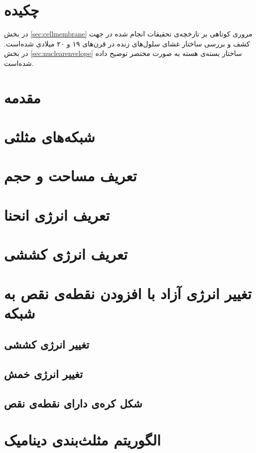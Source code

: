 \setRL
\clearpage
\def \MemDiscr {\Mempath /MembraneDiscrete}

\section{
چکیده
}
در بخش
\ref{sec:cellmembrane}
مروری کوتاهی بر تارخچه‌ی تحقیقات انجام شده در جهت کشف و بررسی ساختار غشای سلول‌های زنده در قرن‌های ۱۹ و ۲۰ میلادی شده‌است. در بخش
\ref{sec:nuclearenvelope}
ساختار بسته‌ی هسته به صورت مختصر توضیح داده شده‌است.

\section{
مقدمه
}



\section{
شبکه‌های مثلثی
}



\section{
تعریف مساحت و حجم
\label{sec:areaVolumeDiscr}
}



\section{
تعریف انرژی انحنا
}



\section{
تعریف انرژی کششی
}


\section{
تغییر انرژی آزاد با افزودن نقطەی نقص به شبکه
}
\subsection{
تغییر انرژی کششی
}

\subsection{
تغییر انرژی خمش
}

\subsection{
شکل کره‌ی دارای نقطه‌ی نقص
\label{sec:gammaTransition}
}


\section{
الگوریتم مثلث‌بندی دینامیک
}





